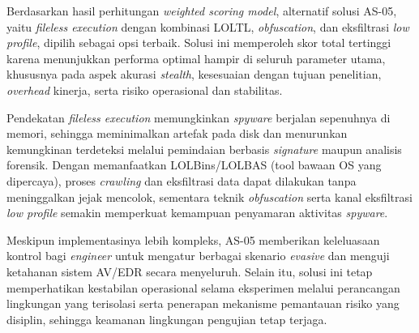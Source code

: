 

Berdasarkan hasil perhitungan \textit{weighted scoring model}, alternatif solusi AS{-}05, yaitu 
\textit{fileless execution} dengan kombinasi LOLTL, \textit{obfuscation}, dan eksfiltrasi \textit{low profile}, 
dipilih sebagai opsi terbaik. Solusi ini memperoleh skor total tertinggi karena menunjukkan performa 
optimal hampir di seluruh parameter utama, khususnya pada aspek akurasi \textit{stealth}, kesesuaian 
dengan tujuan penelitian, \textit{overhead} kinerja, serta risiko operasional dan stabilitas.

Pendekatan \textit{fileless execution} memungkinkan \textit{spyware} berjalan sepenuhnya di 
memori, sehingga meminimalkan artefak pada disk dan menurunkan kemungkinan terdeteksi melalui 
pemindaian berbasis \textit{signature} maupun analisis forensik. Dengan memanfaatkan LOLBins/LOLBAS 
(tool bawaan OS yang dipercaya), proses \textit{crawling} dan eksfiltrasi data dapat dilakukan tanpa 
meninggalkan jejak mencolok, sementara teknik \textit{obfuscation} serta kanal eksfiltrasi \textit{low 
profile} semakin memperkuat kemampuan penyamaran aktivitas \textit{spyware}.

Meskipun implementasinya lebih kompleks, AS{-}05 memberikan keleluasaan kontrol bagi \textit{engineer} 
untuk mengatur berbagai skenario \textit{evasive} dan menguji ketahanan sistem AV/EDR secara menyeluruh. 
Selain itu, solusi ini tetap memperhatikan kestabilan operasional selama eksperimen melalui perancangan 
lingkungan yang terisolasi serta penerapan mekanisme pemantauan risiko yang disiplin, sehingga keamanan 
lingkungan pengujian tetap terjaga.